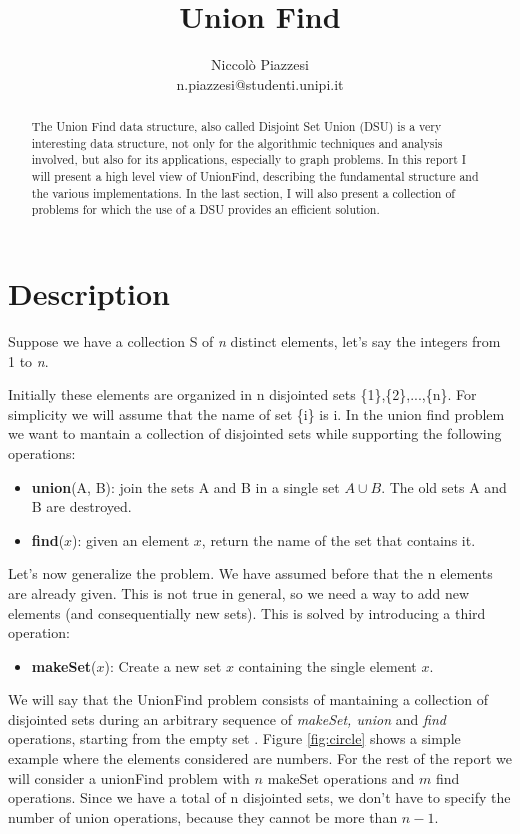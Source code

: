 \documentclass{article}
\begin{document}
\title{ \textbf{Union Find}}
\author{Niccolò Piazzesi\\n.piazzesi@studenti.unipi.it}
\maketitle
\begin{abstract}
The Union Find data structure, also called Disjoint Set Union (DSU) is a very interesting data structure, not 
only  for the algorithmic techniques and  analysis involved, but also for its applications, especially to graph problems. In this
report I will present a high level view of UnionFind, describing the fundamental structure and the various implementations. In the last section, I will also present
a collection of problems for which the use of a DSU provides an efficient solution.
\end{abstract}
\section{Description}
Suppose we have a collection S of \emph{n} distinct elements, let's say the integers from 1 to \emph{n}. 

Initially these elements
are organized in n disjointed sets \{1\},\{2\},...,\{n\}. For simplicity we will assume that the name of set \{i\}
is i. In the union find problem we want to mantain a collection of disjointed sets while supporting the following operations:
\begin{itemize}
    \item \textbf{union}(A, B): join the sets A and B in a single set $A \cup B$. The old sets A and B are destroyed.
    \item \textbf{find}($x$): given an element $x$, return the name of the set that contains it.
\end{itemize}
Let's now generalize the problem. We have assumed before that the n elements are already given. This is not true in general, so we need a way to 
add new elements (and consequentially new sets). This is solved by introducing a third operation:
\begin{itemize}
    \item \textbf{makeSet}($x$): Create a new set {$x$} containing the single element $x$.
\end{itemize}
    We will say that the UnionFind problem consists of mantaining a collection of disjointed sets during 
an arbitrary sequence of \emph{makeSet, union} and \emph{find} operations, starting from the empty set \cite{demetrescu}. Figure \ref{fig:circle} shows a
simple example where the elements considered are numbers. For the rest of the report we will consider a unionFind problem with
$n$ makeSet operations and $m$ find operations. Since we have a total of n disjointed sets, we don't have to specify the number
of union operations, because they cannot be more than $n-1$.
\end{document}
